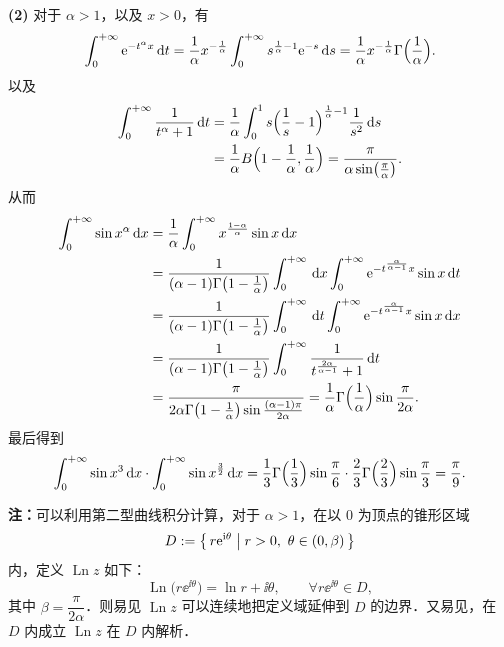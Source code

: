 \begin{solution}
\textbf{(2)} 对于 $\alpha>1$，以及 $x>0$，有
\[
  \int_0^{+\infty}\mathrm{e}^{-t^\alpha x}\,\mathrm{d} t
  =\frac{1}{\alpha}x^{-\frac{1}{\alpha}}\int_0^{+\infty}s^{\frac{1}{\alpha}-1}\mathrm{e}^{-s}\,\mathrm{d} s
  =\frac{1}{\alpha}x^{-\frac{1}{\alpha}}\Gamma\Bigl(\frac{1}{\alpha}\Bigr).
\]
以及
\begin{align*}
  \int_0^{+\infty}\frac{1}{t^\alpha+1}\,\mathrm{d} t
  &=\frac{1}{\alpha}\int_0^1s\Bigl(\frac{1}{s}-1\Bigr)^{\frac{1}{\alpha}-1}\frac{1}{s^2}\,\mathrm{d} s\\
  &=\frac{1}{\alpha}B\Bigl(1-\frac{1}{\alpha},\frac{1}{\alpha}\Bigr)
   =\frac{\pi}{\alpha\sin\bigl(\frac{\pi}{\alpha}\bigr)}.
\end{align*}
从而
\begin{align*}
  \int_0^{+\infty}\sin x^\alpha\,\mathrm{d} x
  &=\frac{1}{\alpha}\int_0^{+\infty}x^{\frac{1-\alpha}{\alpha}}\sin x\,\mathrm{d} x\\
  &=\frac{1}{(\alpha-1)\Gamma\bigl(1-\frac{1}{\alpha}\bigr)}
    \int_0^{+\infty}\,\mathrm{d} x\int_0^{+\infty}\mathrm{e}^{-t^{\frac{\alpha}{\alpha-1}}x}\sin x\,\mathrm{d} t\\
  &=\frac{1}{(\alpha-1)\Gamma\bigl(1-\frac{1}{\alpha}\bigr)}
    \int_0^{+\infty}\,\mathrm{d} t\int_0^{+\infty}\mathrm{e}^{-t^{\frac{\alpha}{\alpha-1}}x}\sin x\,\mathrm{d} x\\
  &=\frac{1}{(\alpha-1)\Gamma\bigl(1-\frac{1}{\alpha}\bigr)}
    \int_0^{+\infty}\frac{1}{t^{\frac{2\alpha}{\alpha-1}}+1}\,\mathrm{d} t\\
  &=\frac{\pi}{2\alpha\Gamma\bigl(1-\frac{1}{\alpha}\bigr)\sin\frac{(\alpha-1)\pi}{2\alpha}}
   =\frac{1}{\alpha}\Gamma\Bigl(\frac{1}{\alpha}\Bigr)\sin\frac{\pi}{2\alpha}.
\end{align*}
最后得到
\[
  \int_0^{+\infty}\sin x^3\,\mathrm{d} x\cdot\int_0^{+\infty}\sin x^{\frac{3}{2}}\,\mathrm{d} x
  =\frac{1}{3}\Gamma\Bigl(\frac{1}{3}\Bigr)\sin\frac{\pi}{6}
  \cdot\frac{2}{3}\Gamma\Bigl(\frac{2}{3}\Bigr)\sin\frac{\pi}{3}=\frac{\pi}{9}.
\]

\textbf{注：}可以利用第二型曲线积分计算，对于 $\alpha>1$，在以 $0$ 为顶点的锥形区域
\[
  D:=\bigl\{\,r\ee^{\ii\theta}\bigm| r>0,\ \theta\in(0,\beta)\,\bigr\}
\]
内，定义 $\operatorname{Ln}z$ 如下：
\[
  \operatorname{Ln}\bigl(r\ee^{\ii\theta}\bigr)=\ln r+\ii\theta,\qquad \forall r\ee^{\ii\theta}\in D,
\]
其中 $\beta=\dfrac{\pi}{2\alpha}$．则易见 $\operatorname{Ln}z$ 可以连续地把定义域延伸到 $D$ 的边界．又易见，在 $D$ 内成立 $\operatorname{Ln}z$ 在 $D$ 内解析．


\end{solution}
